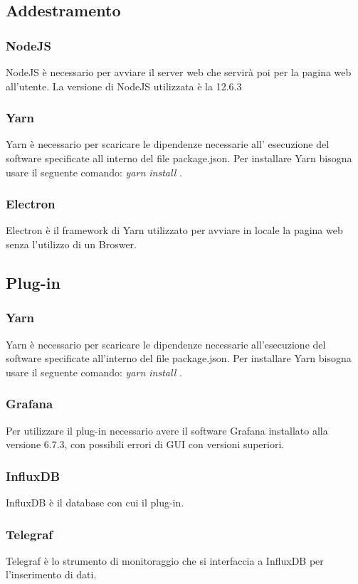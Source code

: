 \documentclass[../manuale-sviluppatore.tex]{subfiles}
\begin{document}
\subsection{Addestramento}%
\label{subs:addestramento}

\subsubsection{NodeJS}
\label{sssec:nodejs}
     NodeJS è necessario per avviare il server web che servirà poi per la pagina web all'utente. La versione di NodeJS utilizzata è la 12.6.3 

\subsubsection{Yarn}
\label{sssec:yarn}
    Yarn è necessario per scaricare le dipendenze necessarie all' esecuzione del software specificate all interno del file package.json. Per installare Yarn bisogna usare il seguente comando: \emph{yarn install} .
    
\subsubsection{Electron}
\label{sssec:electron}
    Electron è il framework di Yarn utilizzato per avviare in locale la pagina web senza l'utilizzo di un Broswer.
     
\subsection{Plug-in}%
\label{subs:plug_in}

\subsubsection{Yarn}
\label{sssec:yarn}
    Yarn è necessario per scaricare le dipendenze necessarie all'esecuzione del software specificate all'interno del file package.json. Per installare Yarn bisogna usare il seguente comando: \emph{yarn install} .
    
\subsubsection{Grafana}
\label{sssec:grafana}
    Per utilizzare il plug-in necessario avere il software Grafana installato alla versione 6.7.3, con possibili errori di GUI con versioni superiori.
    
\subsubsection{InfluxDB}
\label{sssec:influxdb}
    InfluxDB è il database con cui il plug-in.
    
\subsubsection{Telegraf}
\label{sssec:telegraf}
    Telegraf è lo strumento di monitoraggio che si interfaccia a InfluxDB per l'inserimento di dati.
\end{document}
